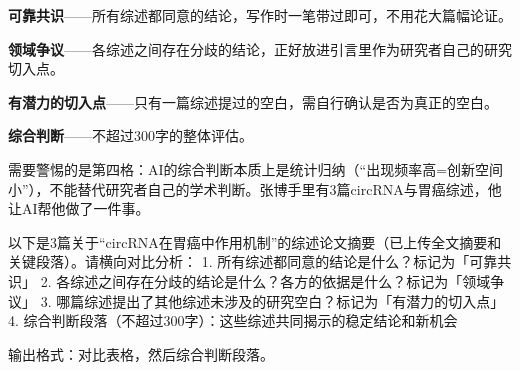 \textbf{可靠共识}——所有综述都同意的结论，写作时一笔带过即可，不用花大篇幅论证。

\textbf{领域争议}——各综述之间存在分歧的结论，正好放进引言里作为研究者自己的研究切入点。

\textbf{有潜力的切入点}——只有一篇综述提过的空白，需自行确认是否为真正的空白。

\textbf{综合判断}——不超过300字的整体评估。

需要警惕的是第四格：AI的综合判断本质上是统计归纳（``出现频率高=创新空间小''），不能替代研究者自己的学术判断。张博手里有3篇circRNA与胃癌综述，他让AI帮他做了一件事。

\begin{userbox}
以下是3篇关于``circRNA在胃癌中作用机制''的综述论文摘要（已上传全文摘要和关键段落）。请横向对比分析：
1. 所有综述都同意的结论是什么？标记为「可靠共识」
2. 各综述之间存在分歧的结论是什么？各方的依据是什么？标记为「领域争议」
3. 哪篇综述提出了其他综述未涉及的研究空白？标记为「有潜力的切入点」
4. 综合判断段落（不超过300字）：这些综述共同揭示的稳定结论和新机会

输出格式：对比表格，然后综合判断段落。
\end{userbox}

